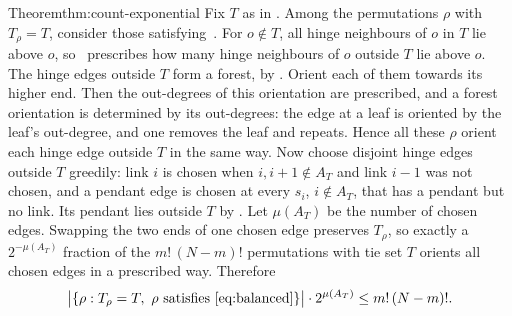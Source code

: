 \begin{Proof}{Theorem}{thm:count-exponential}
Fix $T$ as in . Among the permutations $\rho$
with $T_\rho=T$, consider those satisfying~. For $o\notin
T$, all hinge neighbours of $o$ in $T$ lie above $o$, so~
prescribes how many hinge neighbours of $o$ outside $T$ lie above $o$.
The hinge edges outside $T$ form a forest, by .
Orient each of them towards its higher end. Then the out-degrees of this
orientation are prescribed, and a forest
orientation is determined by its out-degrees: the edge at a leaf is
oriented by the leaf's out-degree, and one removes the leaf and repeats.
Hence all these $\rho$ orient each hinge edge outside $T$ in the same way.
Now choose disjoint hinge edges outside $T$ greedily: link $i$ is chosen
when $i,i+1\notin A_T$ and link $i-1$ was not chosen, and a pendant edge is
chosen at every $s_i$, $i\notin A_T$, that has a pendant but no link. Its
pendant lies outside $T$ by . Let $\mu(A_T)$ be
the number of chosen edges. Swapping the two ends of one chosen edge
preserves $T_\rho$, so exactly a $2^{-\mu(A_T)}$ fraction of the
$m!\,(N-m)!$ permutations with tie set $T$ orients all chosen edges in a
prescribed way. Therefore
\begin{align}\label{eq:order-count}
 \bigl|\{\rho:T_\rho=T,\ \rho\text{ satisfies~\Cref{eq:balanced}}\}\bigr|\cdot2^{\mu(A_T)}\leq m!\,(N-m)!.
\end{align}


\end{Proof}
